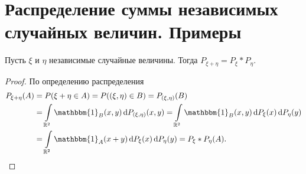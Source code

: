 \section{Распределение суммы независимых случайных величин. Примеры}

\begin{theorem}

    Пусть $\xi$ и $\eta$ независимые случайные величины. Тогда $P_{\xi + \eta} = P_\xi * P_\eta$.
 \end{theorem}

 \begin{proof}
    По определению распределения
    \begin{align*}
        P_{\xi + \eta}(A) &= P(\xi + \eta \in A) = P((\xi, \eta) \in B) = P_{(\xi, \eta)}(B) \\&=\int\limits_{\mathbb{R}^2}\mathbbm{1}_B (x, y) \dd P_{(\xi, \eta)}(x, y) = \int\limits_{\mathbb{R}^2}\mathbbm{1}_B(x, y)\dd P_{\xi}(x) \dd P_\eta(y) \\&=\int\limits_{\mathbb{R}^2}\mathbbm{1}_A(x + y)\dd P_{\xi}(x) \dd P_\eta(y) = P_\xi * P_\eta (A).
    \end{align*}
    
 \end{proof}

